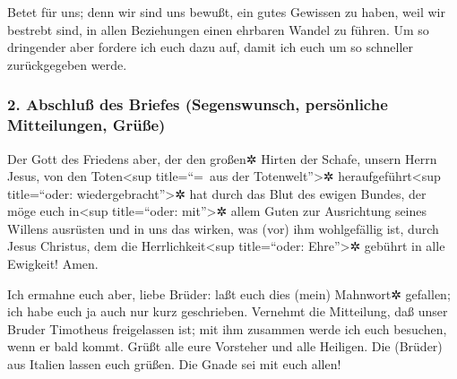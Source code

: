  Betet für uns; denn wir sind uns bewußt, ein gutes
Gewissen zu haben, weil wir bestrebt sind, in allen Beziehungen einen
ehrbaren Wandel zu führen.  Um so dringender aber fordere
ich euch dazu auf, damit ich euch um so schneller zurückgegeben werde.

\hypertarget{abschluuxdf-des-briefes-segenswunsch-persuxf6nliche-mitteilungen-gruxfcuxdfe}{%
\subsubsection{2. Abschluß des Briefes (Segenswunsch, persönliche
Mitteilungen,
Grüße)}\label{abschluuxdf-des-briefes-segenswunsch-persuxf6nliche-mitteilungen-gruxfcuxdfe}}

 Der Gott des Friedens aber, der den großen✲ Hirten der
Schafe, unsern Herrn Jesus, von den Toten\textless sup title=``=~aus der
Totenwelt''\textgreater✲ heraufgeführt\textless sup title=``oder:
wiedergebracht''\textgreater✲ hat durch das Blut des ewigen Bundes,
 der möge euch in\textless sup title=``oder:
mit''\textgreater✲ allem Guten zur Ausrichtung seines Willens ausrüsten
und in uns das wirken, was (vor) ihm wohlgefällig ist, durch Jesus
Christus, dem die Herrlichkeit\textless sup title=``oder:
Ehre''\textgreater✲ gebührt in alle Ewigkeit! Amen.

 Ich ermahne euch aber, liebe Brüder: laßt euch dies
(mein) Mahnwort✲ gefallen; ich habe euch ja auch nur kurz geschrieben.
 Vernehmt die Mitteilung, daß unser Bruder Timotheus
freigelassen ist; mit ihm zusammen werde ich euch besuchen, wenn er bald
kommt.  Grüßt alle eure Vorsteher und alle Heiligen. Die
(Brüder) aus Italien lassen euch grüßen.  Die Gnade sei
mit euch allen!

